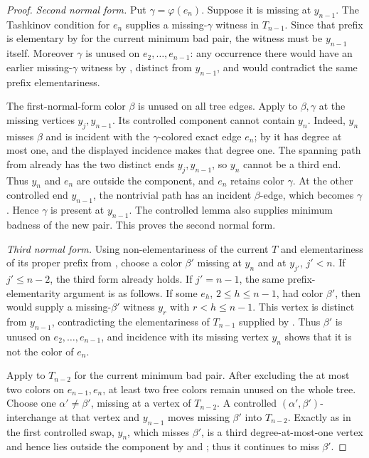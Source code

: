 \begin{proof}
\emph{Second normal form.}
Put \(\gamma=\varphi(e_n)\).  Suppose it is missing at \(y_{n-1}\).
The Tashkinov condition for \(e_n\) supplies a missing-\(\gamma\)
witness in \(T_{n-1}\).  Since that prefix is elementary by
 for the current minimum bad
pair, the witness must be \(y_{n-1}\) itself.  Moreover \(\gamma\) is
unused on \(e_2,\ldots,e_{n-1}\): any occurrence there would have an
earlier missing-\(\gamma\) witness by , distinct
from \(y_{n-1}\), and would contradict the same prefix elementariness.

The first-normal-form color \(\beta\) is unused on all tree edges.
Apply  to \(\beta,\gamma\) at
the missing vertices \(y_j,y_{n-1}\).  Its controlled component cannot
contain \(y_n\).  Indeed, \(y_n\) misses \(\beta\) and is incident with
the \(\gamma\)-colored exact edge \(e_n\); by
 it has degree at most one, and
the displayed incidence makes that degree one.  The spanning path from
 already has the two distinct
ends \(y_j,y_{n-1}\), so \(y_n\) cannot be a third end.  Thus \(y_n\)
and \(e_n\) are outside the component, and \(e_n\) retains color
\(\gamma\).  At the other controlled end \(y_{n-1}\), the nontrivial
path has an incident \(\beta\)-edge, which becomes \(\gamma\).  Hence
\(\gamma\) is present at \(y_{n-1}\).  The controlled lemma also supplies
minimum badness of the new pair.  This proves the second normal form.

\emph{Third normal form.}
Using non-elementariness of the current \(T\) and elementariness of its
proper prefix from , choose a
color \(\beta'\) missing at \(y_n\) and at \(y_{j'}\), \(j'<n\).
If \(j'\le n-2\), the third form already holds.  If \(j'=n-1\), the same
prefix-elementarity argument is as follows.  If some
\(e_h\), \(2\le h\le n-1\), had color \(\beta'\), then
 would supply a missing-\(\beta'\) witness
\(y_r\) with \(r<h\le n-1\).  This vertex is distinct from
\(y_{n-1}\), contradicting the elementariness of \(T_{n-1}\) supplied by
.  Thus \(\beta'\) is unused on
\(e_2,\ldots,e_{n-1}\), and incidence with its missing vertex \(y_n\)
shows that it is not the color of \(e_n\).

Apply  to \(T_{n-2}\) for the current
minimum bad pair.  After excluding the at most two colors on
\(e_{n-1},e_n\), at least two free colors remain unused on the whole
tree.  Choose one \(\alpha'\ne\beta'\), missing at a vertex of
\(T_{n-2}\).  A controlled \((\alpha',\beta')\)-interchange at that
vertex and \(y_{n-1}\) moves missing \(\beta'\) into \(T_{n-2}\).
Exactly as in the first controlled swap, \(y_n\), which misses
\(\beta'\), is a third degree-at-most-one vertex and hence lies outside
the component by  and
; thus it continues to miss
\(\beta'\).


\end{proof}
